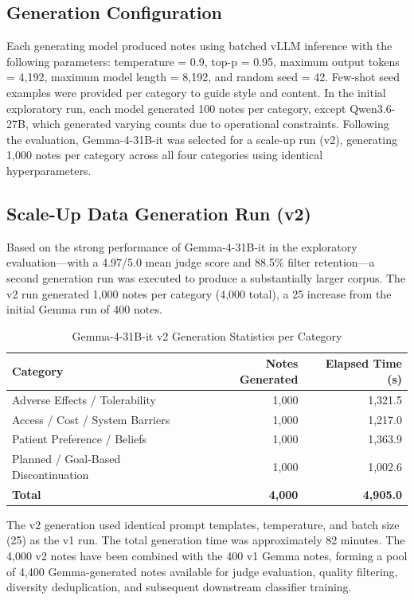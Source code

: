 \documentclass[11pt, a4paper]{article}
\begin{document}
\subsection{Generation Configuration}

Each generating model produced notes using batched vLLM inference with the following parameters: temperature = 0.9, top-p = 0.95, maximum output tokens = 4,192, maximum model length = 8,192, and random seed = 42. Few-shot seed examples were provided per category to guide style and content. In the initial exploratory run, each model generated 100 notes per category, except Qwen3.6-27B, which generated varying counts due to operational constraints. Following the evaluation, Gemma-4-31B-it was selected for a scale-up run (v2), generating 1,000 notes per category across all four categories using identical hyperparameters.

\subsection{Scale-Up Data Generation Run (v2)}

Based on the strong performance of Gemma-4-31B-it in the exploratory evaluation---with a 4.97/5.0 mean judge score and 88.5\% filter retention---a second generation run was executed to produce a substantially larger corpus. The v2 run generated 1,000 notes per category (4,000 total), a 25\texttimes{} increase from the initial Gemma run of 400 notes.

\begin{table}[H]
\centering
\caption{Gemma-4-31B-it v2 Generation Statistics per Category}
\label{tab:v2_stats}
\begin{tabular}{lrr}
\toprule
\textbf{Category} & \textbf{Notes Generated} & \textbf{Elapsed Time (s)} \\
\midrule
Adverse Effects / Tolerability & 1,000 & 1,321.5 \\
Access / Cost / System Barriers & 1,000 & 1,217.0 \\
Patient Preference / Beliefs & 1,000 & 1,363.9 \\
Planned / Goal-Based Discontinuation & 1,000 & 1,002.6 \\
\midrule
\textbf{Total} & \textbf{4,000} & \textbf{4,905.0} \\
\bottomrule
\end{tabular}
\end{table}

The v2 generation used identical prompt templates, temperature, and batch size (25) as the v1 run. The total generation time was approximately 82 minutes. The 4,000 v2 notes have been combined with the 400 v1 Gemma notes, forming a pool of 4,400 Gemma-generated notes available for judge evaluation, quality filtering, diversity deduplication, and subsequent downstream classifier training.
\end{document}
